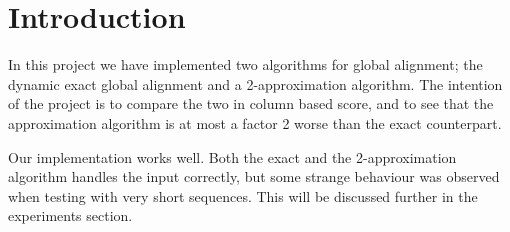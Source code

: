 \section{Introduction}
In this project we have implemented two algorithms for global alignment; the dynamic exact global alignment and a 2-approximation algorithm. The intention of the project is to compare the two in column based score, and to see that the approximation algorithm is at most a factor 2 worse than the exact counterpart. 

Our implementation works well. Both the exact and the 2-approximation algorithm handles the input correctly, but some strange behaviour was observed when testing with very short sequences. This will be discussed further in the experiments section. 